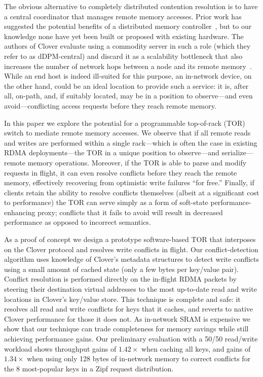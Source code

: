 The obvious alternative to completely distributed contention
resolution is to have a central coordinator that manages remote memory
accesses.  Prior work has suggested the potential benefits of a
distributed memory controller~\cite{disandapp}, but to our knowledge
none have yet been built or proposed with existing hardware.  The
authors of Clover evaluate using a commodity server in such a role
(which they refer to as dDPM-central) and discard it as a scalability
bottleneck that also increases the number of network hops between a
node and its remote memory~\cite{clover}.  While an end host is indeed
ill-suited for this purpose, an in-network device, on
the other hand, could be an ideal location to provide such a service:
it is, after all, on-path, and, if suitably located, may be in a
position to observe---and even avoid---conflicting access
requests before they reach remote memory.

In this paper we explore the potential for a programmable top-of-rack
(TOR) switch to mediate remote memory accesses.  We observe that if
all remote reads and writes are performed within a single rack---which
is often the case in existing RDMA deployments---the TOR in a unique
position to observe---and serialize---remote memory operations.
Moreover, if the TOR is able to parse and modify requests in flight, it
can even resolve conflicts before they reach the remote memory,
effectively recovering from optimistic write failures ``for free.''
Finally, if clients retain the ability to resolve conflicts
themselves (albeit at a significant cost to performance) the TOR can
serve simply as a form of soft-state performance-enhancing proxy;
conflicts that it fails to avoid will result in
decreased performance as opposed to incorrect semantics.

As a proof of concept we design a prototype software-based TOR that
interposes on the Clover protocol and resolves write conflicts in
flight. Our conflict-detection algorithm uses knowledge of Clover's
metadata structures to detect write conflicts using a small amount of
cached state (only a few bytes per key/value pair). Conflict
resolution is performed directly on the in-flight RDMA packets by
steering their destination virtual addresses to the most up-to-date
read and write locations in Clover's key/value store. This technique
is complete and safe: it resolves all read and write conflicts for
keys that it caches, and reverts to native Clover performance for
those it does not. As in-network SRAM is expensive we show that our
technique can trade completeness for memory savings while still
achieving performance gains. Our preliminary evaluation with a 50/50
read/write workload shows throughput gains of $1.42\times$ when
caching all keys, and gains of $1.34\times$ when using only 128 bytes
of in-network memory to correct conflicts for the 8 most-popular keys
in a Zipf request distribution.
